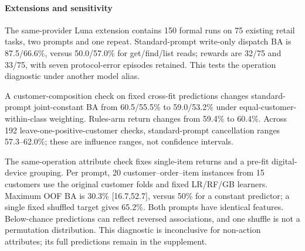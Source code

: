 \paragraph{Extensions and sensitivity}
The same-provider Luna extension contains 150 formal runs on 75 existing retail tasks, two prompts and one repeat. Standard-prompt write-only dispatch BA is 87.5/66.6\%, versus 50.0/57.0\% for get/find/list reads; rewards are 32/75 and 33/75, with seven protocol-error episodes retained. This tests the operation diagnostic under another model alias.

A customer-composition check on fixed cross-fit predictions changes standard-prompt joint-constant BA from 60.5/55.5\% to 59.0/53.2\% under equal-customer-within-class weighting. Rules-arm return changes from 59.4\% to 60.4\%. Across 192 leave-one-positive-customer checks, standard-prompt cancellation ranges 57.3--62.0\%; these are influence ranges, not confidence intervals.

The same-operation attribute check fixes single-item returns and a pre-fit digital-device grouping. Per prompt, 20 customer--order--item instances from 15 customers use the original customer folds and fixed LR/RF/GB learners. Maximum OOF BA is 30.3\% [16.7,52.7], versus 50\% for a constant predictor; a single fixed shuffled target gives 65.2\%. Both prompts have identical features. Below-chance predictions can reflect reversed associations, and one shuffle is not a permutation distribution. This diagnostic is inconclusive for non-action attributes; its full predictions remain in the supplement.
